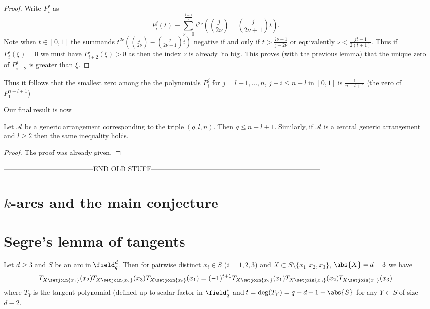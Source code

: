 \message{ !name(OnTheRAIDProblem.tex)}\documentclass[8pt,a4paper]{article}
\begin{document}
\begin{proof}
Write $P_i^j$ as
\begin{equation}
P_i^j(t)=\sum_{\nu=0}^{\frac{i-1}{2}}{t^{2\nu}\left(\binom{j}{2\nu}-\binom{j}{2\nu+1}t\right)}\text{.}
\end{equation}
Note when $t\in[0,1]$ the summands $t^{2\nu}\left(\binom{j}{2\nu}-\binom{j}{2\nu+1}t\right)$ negative if and only if $t>\frac{2\nu+1}{j-2\nu}$ or equivalently $\nu<\frac{jt-1}{2(t+1)}$. Thus if $P_i^j(\xi)=0$ we must have $P_{i+2}^j(\xi)>0$ as then the index $\nu$ is already 'to big'.
This proves (with the previous lemma) that the unique zero of $P_{i+2}^j$ is greater than $\xi$.
\end{proof}

Thus it follows that the smallest zero among the the polynomials $P_i^j$ for $j=l+1,\ldots,n$, $j-i\leq n-l$ in $[0,1]$ is $\frac{1}{n-l+1}$ (the zero of $P_1^{n-l+1}$).

Our final result is now

\begin{lemma} Let $\mathcal{A}$ be a generic arrangement corresponding to the triple $(q,l,n)$. Then $q\leq n-l+1$. Similarly, if $\mathcal{A}$ is a central generic arrangement and $l\geq 2$ then the same inequality holds.
\end{lemma}

\begin{proof}
The proof was already given.
\end{proof}

---------------------------------------END OLD STUFF--------------------------------------------------------------------------

\section{$k$-arcs and the main conjecture}

\section{Segre's lemma of tangents}

\begin{lemma}
Let $d\geq3$ and $S$ be an arc in $\field_q^d$. Then for pairwise distinct $x_i\in S$ ($i=1,2,3$) and $X\subset S\setminus\{x_1,x_2,x_3\}$, $\abs{X}=d-3$ we have
\begin{equation}
T_{X\setjoin\{x_1\}}(x_2)T_{X\setjoin\{x_2\}}(x_3)T_{X\setjoin\{x_3\}}(x_1)=(-1)^{t+1}T_{X\setjoin\{x_2\}}(x_1)T_{X\setjoin\{x_3\}}(x_2)T_{X\setjoin\{x_1\}}(x_3)
\end{equation}
where $T_Y$ is the tangent polynomial (defined up to scalar factor in $\field_q^*$ and $t=\deg(T_Y)=q+d-1-\abs{S}$ for any $Y\subset S$ of size $d-2$.
\end{lemma}
\end{document}
